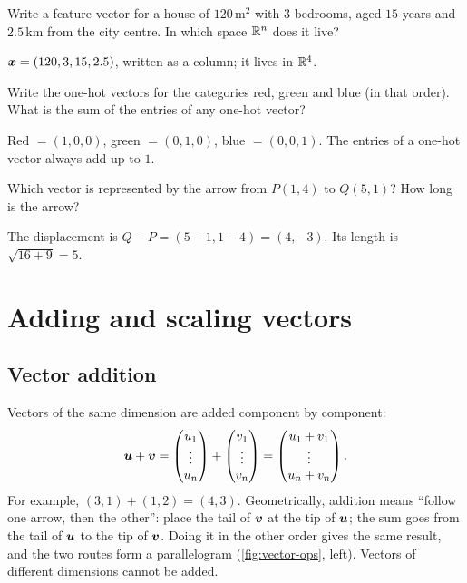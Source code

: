 \sectionexercises

\begin{exercise}
Write a feature vector for a house of $120$\,m$^2$ with $3$ bedrooms, aged
$15$ years and $2.5$\,km from the city centre. In which space $\mathbb{R}^n$ does it
live?
\end{exercise}
\begin{solution}
$\bm{x} = (120, 3, 15, 2.5)$, written as a column; it lives in $\mathbb{R}^4$.
\end{solution}

\begin{exercise}
Write the one-hot vectors for the categories red, green and blue (in that
order). What is the sum of the entries of any one-hot vector?
\end{exercise}
\begin{solution}
Red $= (1,0,0)$, green $= (0,1,0)$, blue $= (0,0,1)$. The entries of a one-hot
vector always add up to $1$.
\end{solution}

\begin{exercise}
Which vector is represented by the arrow from $P(1, 4)$ to $Q(5, 1)$? How long
is the arrow?
\end{exercise}
\begin{solution}
The displacement is $Q - P = (5 - 1, 1 - 4) = (4, -3)$. Its length is
$\sqrt{16 + 9} = 5$.
\end{solution}

\section{Adding and scaling vectors}\label{sec:vector-operations}

\subsection{Vector addition}

Vectors of the same dimension are added component by component:
\[
  \bm{u} + \bm{v} = \begin{pmatrix} u_1 \\ \vdots \\ u_n \end{pmatrix}
  + \begin{pmatrix} v_1 \\ \vdots \\ v_n \end{pmatrix}
  = \begin{pmatrix} u_1 + v_1 \\ \vdots \\ u_n + v_n \end{pmatrix}.
\]
For example, $(3, 1) + (1, 2) = (4, 3)$. Geometrically, addition means
``follow one arrow, then the other'': place the tail of $\bm{v}$ at the tip of
$\bm{u}$; the sum goes from the tail of $\bm{u}$ to the tip of $\bm{v}$. Doing it in
the other order gives the same result, and the two routes form a
parallelogram (\cref{fig:vector-ops}, left). Vectors of different dimensions
cannot be added.

